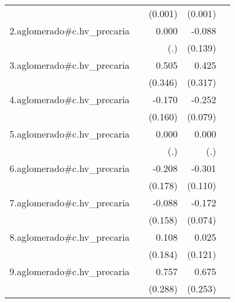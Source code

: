 {\begin{longtable}{l*{4}{D{.}{.}{-1}}}
            &                     &     (0.001)         &     (0.001)         &                     \\
\addlinespace
2.aglomerado#c.hv\_precaria&                     &       0.000         &      -0.088         &                     \\
            &                     &         (.)         &     (0.139)         &                     \\
\addlinespace
3.aglomerado#c.hv\_precaria&                     &       0.505         &       0.425         &                     \\
            &                     &     (0.346)         &     (0.317)         &                     \\
\addlinespace
4.aglomerado#c.hv\_precaria&                     &      -0.170         &      -0.252\sym{**} &                     \\
            &                     &     (0.160)         &     (0.079)         &                     \\
\addlinespace
5.aglomerado#c.hv\_precaria&                     &       0.000         &       0.000         &                     \\
            &                     &         (.)         &         (.)         &                     \\
\addlinespace
6.aglomerado#c.hv\_precaria&                     &      -0.208         &      -0.301\sym{**} &                     \\
            &                     &     (0.178)         &     (0.110)         &                     \\
\addlinespace
7.aglomerado#c.hv\_precaria&                     &      -0.088         &      -0.172\sym{*}  &                     \\
            &                     &     (0.158)         &     (0.074)         &                     \\
\addlinespace
8.aglomerado#c.hv\_precaria&                     &       0.108         &       0.025         &                     \\
            &                     &     (0.184)         &     (0.121)         &                     \\
\addlinespace
9.aglomerado#c.hv\_precaria&                     &       0.757\sym{**} &       0.675\sym{**} &                     \\
            &                     &     (0.288)         &     (0.253)         &                     \\

\end{longtable}}
